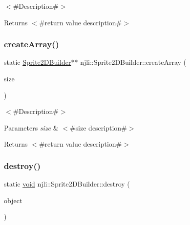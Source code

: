 $<$\#\+Description\#$>$

\begin{DoxyReturn}{Returns}
$<$\#return value description\#$>$ 
\end{DoxyReturn}
\mbox{\label{classnjli_1_1_sprite2_d_builder_a63a3840175f91013b143deb9873d61bd}} 
\subsubsection{\texorpdfstring{create\+Array()}{createArray()}}
{\footnotesize\ttfamily static \mbox{\hyperlink{classnjli_1_1_sprite2_d_builder}{Sprite2\+D\+Builder}}$\ast$$\ast$ njli\+::\+Sprite2\+D\+Builder\+::create\+Array (\begin{DoxyParamCaption}\item[{const \mbox{\hyperlink{_util_8h_a10e94b422ef0c20dcdec20d31a1f5049}{u32}}}]{size }\end{DoxyParamCaption})\hspace{0.3cm}{\ttfamily [static]}}

$<$\#\+Description\#$>$


\begin{DoxyParams}{Parameters}
{\em size} & $<$\#size description\#$>$\\
\hline
\end{DoxyParams}
\begin{DoxyReturn}{Returns}
$<$\#return value description\#$>$ 
\end{DoxyReturn}
\mbox{\label{classnjli_1_1_sprite2_d_builder_a685094b311445e1054f92720b6629dae}} 
\subsubsection{\texorpdfstring{destroy()}{destroy()}}
{\footnotesize\ttfamily static \mbox{\hyperlink{_thread_8h_af1e856da2e658414cb2456cb6f7ebc66}{void}} njli\+::\+Sprite2\+D\+Builder\+::destroy (\begin{DoxyParamCaption}\item[{\mbox{\hyperlink{classnjli_1_1_sprite2_d_builder}{Sprite2\+D\+Builder}} $\ast$}]{object }\end{DoxyParamCaption})\hspace{0.3cm}{\ttfamily [static]}}

